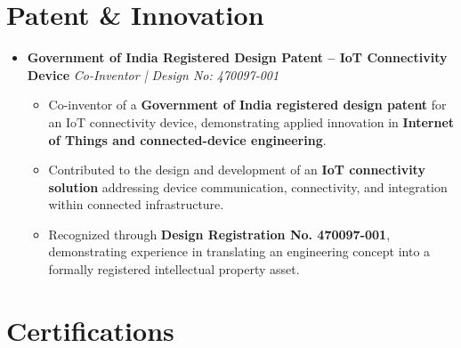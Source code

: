 \documentclass[a4paper,11pt]{article}
\newcommand{\resumeItem}[1]{
\item \small{#1 \vspace{-2pt}}
}
\begin{document}
\section{Patent \& Innovation}

\begin{itemize}[leftmargin=0in, label={}]

\item
\textbf{Government of India Registered Design Patent -- IoT Connectivity Device}
\hfill \textit{Co-Inventor | Design No: 470097-001}

\begin{itemize}[leftmargin=*]

\resumeItem{Co-inventor of a \textbf{Government of India registered design patent} for an IoT connectivity device, demonstrating applied innovation in \textbf{Internet of Things and connected-device engineering}.}

\resumeItem{Contributed to the design and development of an \textbf{IoT connectivity solution} addressing device communication, connectivity, and integration within connected infrastructure.}

\resumeItem{Recognized through \textbf{Design Registration No. 470097-001}, demonstrating experience in translating an engineering concept into a formally registered intellectual property asset.}

\end{itemize}

\end{itemize}

\vspace{-10pt}



\section{Certifications}
\end{document}
